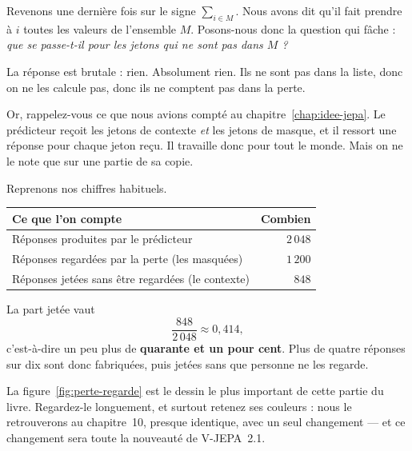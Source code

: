 Revenons une dernière fois sur le signe $\sum_{i \in M}$. Nous avons dit
qu'il fait prendre à $i$ toutes les valeurs de l'ensemble $M$. Posons-nous
donc la question qui fâche : \emph{que se passe-t-il pour les jetons qui ne
sont pas dans $M$ ?}

La réponse est brutale : rien. Absolument rien. Ils ne sont pas dans la
liste, donc on ne les calcule pas, donc ils ne comptent pas dans la perte.

Or, rappelez-vous ce que nous avions compté au chapitre~\ref{chap:idee-jepa}.
Le prédicteur reçoit les jetons de contexte \emph{et} les jetons de masque,
et il ressort une réponse pour chaque jeton reçu. Il travaille donc pour
tout le monde. Mais on ne le note que sur une partie de sa copie.

\begin{exemple}
Reprenons nos chiffres habituels.

\begin{center}
\footnotesize
\begin{tabular}{lr}
\toprule
\textbf{Ce que l'on compte} & \textbf{Combien} \\
\midrule
Réponses produites par le prédicteur & $2\,048$ \\
Réponses regardées par la perte (les masquées) & $1\,200$ \\
Réponses jetées sans être regardées (le contexte) & $848$ \\
\bottomrule
\end{tabular}
\end{center}

La part jetée vaut
\[
  \frac{848}{2\,048} \approx 0{,}414 ,
\]
c'est-à-dire un peu plus de \textbf{quarante et un pour cent}. Plus de
quatre réponses sur dix sont donc fabriquées, puis jetées sans que personne
ne les regarde.
\end{exemple}

La figure~\ref{fig:perte-regarde} est le dessin le plus important de cette
partie du livre. Regardez-le longuement, et surtout retenez ses couleurs :
nous le retrouverons au chapitre~10, presque identique, avec un seul
changement — et ce changement sera toute la nouveauté de V-JEPA~2.1.

